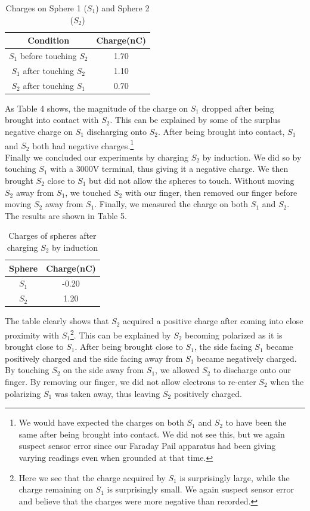 \documentclass[12pt]{amsart}
\begin{document}
\begin{table}[H]
	\begin{tabular}{ |c|c|}
		\hline
		 Condition& Charge(nC)\\
		\hline
		$S_1$ before touching $S_2$&1.70\\
		$S_1$ after touching $S_2$&1.10\\
		$S_2$ after touching $S_1$&0.70\\
		\hline	
	\end{tabular}
	\caption{Charges on Sphere 1 ($S_1$) and Sphere 2 ($S_2$)}
\end{table}

\indent As Table 4 shows, the magnitude of the charge on $S_1$ dropped after being brought into contact with $S_2$. This can be explained by some of the surplus negative charge on $S_1$ discharging onto $S_2$. After being brought into contact, $S_1$ and $S_2$ both had negative charges.\footnote{We would have expected the charges on both $S_1$ and $S_2$ to have been the same after being brought into contact. We did not see this, but we again suspect sensor error since our Faraday Pail apparatus had been giving varying readings even when grounded at that time.}\\

\indent Finally we concluded our experiments by charging $S_2$ by induction. We did so by touching $S_1$ with a 3000V terminal, thus giving it a negative charge. We then brought $S_2$ close to $S_1$ but did not allow the spheres to touch. Without moving $S_2$ away from $S_1$, we touched $S_2$ with our finger, then removed our finger before moving $S_2$ away from $S_1$. Finally, we measured the charge on both $S_1$ and $S_2$. The results are shown in Table 5.

\begin{table}[H]
	\begin{tabular}{ |c|c|}
		\hline
		Sphere & Charge(nC)\\
		\hline
		$S_1$&-0.20\\
		$S_2$&1.20\\
		\hline	
	\end{tabular}
	\caption{Charges of spheres after charging $S_2$ by induction}
\end{table}

\indent The table clearly shows that $S_2$ acquired a positive charge after coming into close proximity with $S_1$\footnote{Here we see that the charge acquired by $S_1$ is surprisingly large, while the charge remaining on $S_1$ is surprisingly small. We again suspect sensor error and believe that the charges were more negative than recorded.}. This can be explained by $S_2$ becoming polarized as it is brought close to $S_1$. After being brought close to $S_1$, the side facing $S_1$ became positively charged and the side facing away from $S_1$ became negatively charged. By touching $S_2$ on the side away from $S_1$, we allowed $S_2$ to discharge onto our finger. By removing our finger, we did not allow electrons to re-enter $S_2$ when the polarizing $S_1$ was taken away, thus leaving $S_2$ positively charged.
\end{document}
